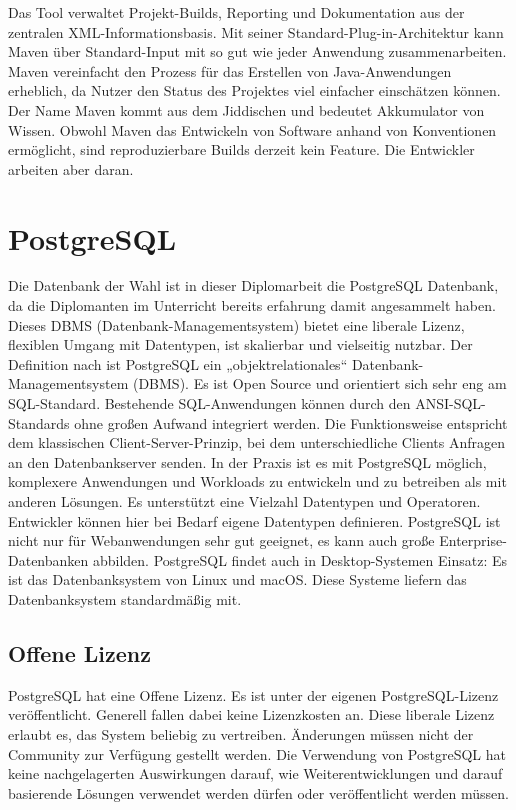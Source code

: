 Das Tool verwaltet Projekt-Builds, Reporting und Dokumentation aus der zentralen XML-Informationsbasis. 
Mit seiner Standard-Plug-in-Architektur kann Maven über Standard-Input mit so gut wie jeder Anwendung zusammenarbeiten.
Maven vereinfacht den Prozess für das Erstellen von Java-Anwendungen erheblich, da Nutzer den Status des Projektes viel einfacher einschätzen können.
Der Name Maven kommt aus dem Jiddischen und bedeutet Akkumulator von Wissen. Obwohl Maven das Entwickeln von Software anhand von Konventionen ermöglicht, 
sind reproduzierbare Builds derzeit kein Feature. Die Entwickler arbeiten aber daran. 
\cite{sysarch-maven-1}

\section{PostgreSQL}

Die Datenbank der Wahl ist in dieser Diplomarbeit die PostgreSQL Datenbank, da die Diplomanten im Unterricht bereits erfahrung damit angesammelt haben.
Dieses DBMS (Datenbank-Managementsystem) bietet eine liberale Lizenz, flexiblen Umgang mit Datentypen, ist skalierbar und vielseitig nutzbar.
Der Definition nach ist PostgreSQL ein „objektrelationales“ Datenbank-Managementsystem (DBMS). Es ist Open Source und orientiert sich sehr eng am SQL-Standard. Bestehende SQL-Anwendungen 
können durch den ANSI-SQL-Standards ohne großen Aufwand integriert werden. Die Funktionsweise entspricht dem klassischen Client-Server-Prinzip, bei dem unterschiedliche Clients Anfragen an den Datenbankserver senden.
In der Praxis ist es mit PostgreSQL möglich, komplexere Anwendungen und Workloads zu entwickeln und zu betreiben als mit anderen Lösungen. 
Es unterstützt eine Vielzahl Datentypen und Operatoren. Entwickler können hier bei Bedarf eigene Datentypen definieren. PostgreSQL ist nicht nur für Webanwendungen sehr gut geeignet, es kann auch große Enterprise-Datenbanken abbilden. 
PostgreSQL findet auch in Desktop-Systemen Einsatz: Es ist das Datenbanksystem von Linux und macOS. Diese Systeme liefern das Datenbanksystem standardmäßig mit.
\cite{sysarch-postgresql-1}

\subsection{Offene Lizenz}
PostgreSQL hat eine Offene Lizenz. Es ist unter der eigenen PostgreSQL-Lizenz veröffentlicht. Generell fallen dabei keine Lizenzkosten an. 
Diese liberale Lizenz erlaubt es, das System beliebig zu vertreiben. Änderungen müssen nicht der Community zur Verfügung gestellt werden. Die Verwendung von PostgreSQL hat 
keine nachgelagerten Auswirkungen darauf, wie Weiterentwicklungen und darauf basierende Lösungen verwendet werden dürfen oder veröffentlicht werden müssen.
\cite{sysarch-postgresql-1}

